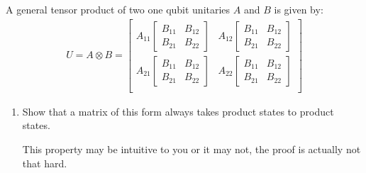 \documentclass[12pt]{article}
\newcommand{\bmat}[1]{\begin{bmatrix}#1\end{bmatrix}}
\newenvironment{answer}{\begingroup\setlength{\leftskip}{-\leftmargin}\begin{framed}}{\end{framed}\endgroup}
\begin{document}
A general tensor product of two one qubit unitaries $A$ and $B$ is given by:
\begin{align*}
    U = A \otimes B = \bmat{
        A_{11}\bmat{B_{11} & B_{12} \\ B_{21} & B_{22}} &
        A_{12}\bmat{B_{11} & B_{12} \\ B_{21} & B_{22}} \\
        A_{21}\bmat{B_{11} & B_{12} \\ B_{21} & B_{22}} &
        A_{22}\bmat{B_{11} & B_{12} \\ B_{21} & B_{22}} \\
    }
\end{align*}
\begin{enumerate}
    \item Show that a matrix of this form always takes product states to product states.

    \begin{answer}
        This property may be intuitive to you or it may not, the proof is actually not that hard.


\end{answer}
\end{enumerate}
\end{document}
